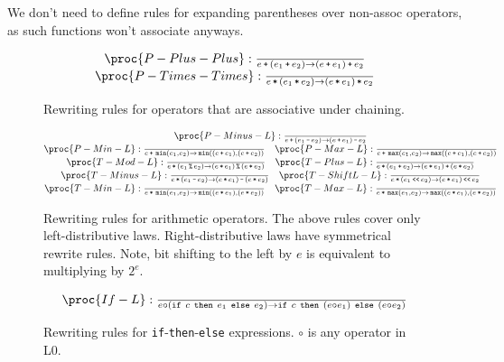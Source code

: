 We don't need to define rules for expanding parentheses over non-assoc
operators, as such functions won't associate anyways.

\begin{figure}[htbp!]
\[
\begin{matrix}
\proc{P-Plus-Plus}:{\over
e \lp \p{e_1 \lp e_2} \rightarrow \p{ e \lp e_1} \lp e_2
}\\
\proc{P-Times-Times}:{\over
e \lt \p{e_1\lt e_2} \rightarrow \p{e \lt e_1} \lt e_2
}\\
\end{matrix}
\]
\caption[]{Rewriting rules for operators that are associative under chaining.}
\label{figure:rewriting-chaining}
\end{figure}

\begin{figure*}[htbp!]
\[
\begin{matrix}
\proc{P-Minus-L}:{\over
e \lp \p{e_1 \lm e_2} \rightarrow \p{e \lp e_1 } \lm e_2
}\\
\proc{P-Min-L}:{\over
e \lp \LMIN\p{e_1, e_2} \rightarrow \LMIN\p{\p{e \lp e_1}, \p{e \lp e_2}}
}\quad
\proc{P-Max-L}:{\over
e \lp \LMAX\p{e_1, e_2} \rightarrow \LMAX\p{\p{e \lp e_1}, \p{e \lp e_2}}
}\\
\proc{T-Mod-L}:{\over
e \lt \p{e_1 \lmod e_2}\rightarrow \p{ e \lt e_1 } \lmod \p{ e \lt e_2 }
}\quad
\proc{T-Plus-L}:{\over
e \lt \p{e_1 \lp e_2} \rightarrow \p{ e \lt e_1 } \lp \p{ e \lt e_2 }
}\\
\proc{T-Minus-L}:{\over
e \lt \p{e_1 \lm e_2} \rightarrow \p{ e\lt e_1 } \lm \p{ e \lt e_2 }
}\quad
\proc{T-ShiftL-L}:{\over
e \lt \p{e_1 \LBSL e_2} \rightarrow \p{ e \lt e_1 } \LBSL e_2
}\\
\proc{T-Min-L}:{\over
e \lt \LMIN\p{e_1, e_2} \rightarrow \LMIN\p{\p{e \lt e_1}, \p{e \lt e_2}}
}\quad
\proc{T-Max-L}:{\over
e \lt \LMAX\p{e_1, e_2} \rightarrow \LMAX\p{\p{e \lt e_1}, \p{e \lt e_2}}
}\\
\end{matrix}
\]
\caption[]{Rewriting rules for arithmetic operators. The above rules cover only
left-distributive laws. Right-distributive laws have symmetrical rewrite rules.
Note, bit shifting to the left by $e$ is equivalent to multiplying by $2^e$.}
\label{figure:rewriting-arithop}
\end{figure*}

\begin{figure*}[htbp!]
\[
\begin{matrix}
\proc{If-L}:{\over
e \circ \p{\mathtt{if}\ c\ \mathtt{then}\ e_1\ \mathtt{else}\ e_2} \rightarrow
\mathtt{if}\ c\ \mathtt{then}\ \p{e \circ e_1} \ \mathtt{else}\ \p{e \circ e_2}
}\\
\end{matrix}
\]
\caption[]{Rewriting rules for \texttt{if}-\texttt{then}-\texttt{else}
expressions. $\circ$ is any operator in L0.}
\label{figure:rewriting-arithop}
\end{figure*}


